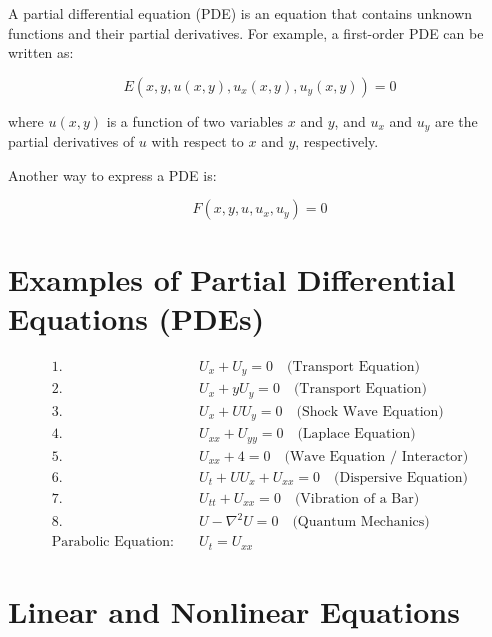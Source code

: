 \documentclass[11pt]{article}
\begin{document}
A partial differential equation (PDE) is an equation that contains unknown functions and their partial derivatives. For example, a first-order PDE can be written as:

\begin{equation}
E(x, y, u(x, y), u_x(x, y), u_y(x, y)) = 0
\end{equation}

where \( u(x, y) \) is a function of two variables \( x \) and \( y \), and \( u_x \) and \( u_y \) are the partial derivatives of \( u \) with respect to \( x \) and \( y \), respectively.

Another way to express a PDE is:

\begin{equation}
F(x, y, u, u_x, u_y) = 0
\end{equation}




\section*{Examples of Partial Differential Equations (PDEs)}

\begin{align}
    1. \quad & U_x + U_y = 0 \quad \text{(Transport Equation)} \\
    2. \quad & U_x + y U_y = 0 \quad \text{(Transport Equation)} \\
    3. \quad & U_x + U U_y = 0 \quad \text{(Shock Wave Equation)} \\
    4. \quad & U_{xx} + U_{yy} = 0 \quad \text{(Laplace Equation)} \\
    5. \quad & U_{xx} + 4 = 0 \quad \text{(Wave Equation / Interactor)} \\
    6. \quad & U_t + U U_x + U_{xx} = 0 \quad \text{(Dispersive Equation)} \\
    7. \quad & U_{tt} + U_{xx} = 0 \quad \text{(Vibration of a Bar)} \\
    8. \quad & U - \nabla^2 U = 0 \quad \text{(Quantum Mechanics)} \\
    \text{Parabolic Equation:} \quad & U_t = U_{xx}
\end{align}




\clearpage
\section*{Linear and Nonlinear Equations}
\end{document}
